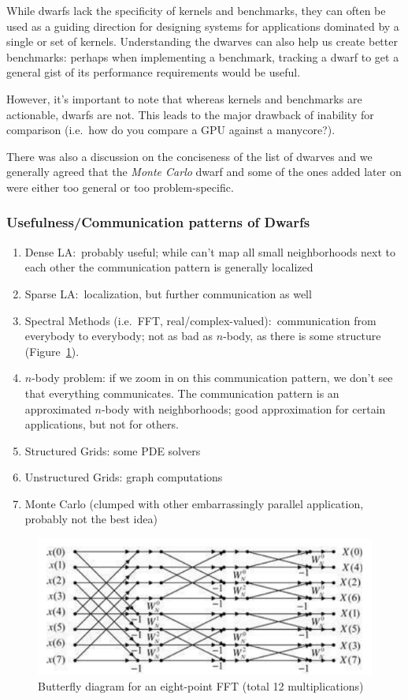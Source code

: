While dwarfs lack the specificity of kernels and benchmarks, they can often be used as a guiding direction for designing systems for applications dominated by a single or set of kernels.
Understanding the dwarves can also help us create better benchmarks: perhaps when implementing a benchmark, tracking a dwarf to get a general gist of its performance requirements would be useful.

However, it's important to note that whereas kernels and benchmarks are actionable, dwarfs are not.
This leads to the major drawback of inability for comparison (i.e.\ how do you compare a GPU against a manycore?).

There was also a discussion on the conciseness of the list of dwarves and we generally agreed that the \textit{Monte Carlo} dwarf and some of the ones added later on were either too general or too problem-specific.

\subsubsection{Usefulness/Communication patterns of Dwarfs}

\begin{enumerate}
    \item Dense LA:\ probably useful; while can't map all small neighborhoods next to each other the communication pattern is generally localized
    \item Sparse LA:\ localization, but further communication as well
    \item Spectral Methods (i.e.\ FFT, real/complex-valued):\ communication from everybody to everybody; not as bad as \( n \)-body, as there is some structure (Figure~\ref{fig:butterfly}).
    \item \( n \)-body problem: if we zoom in on this communication pattern, we don't see that everything communicates.
    The communication pattern is an approximated \( n \)-body with neighborhoods; good approximation for certain applications, but not for others.
    \item Structured Grids: some PDE solvers
    \item Unstructured Grids: graph computations
    \item Monte Carlo (clumped with other embarrassingly parallel application, probably not the best idea)
\end{enumerate}

\begin{figure}
    \centering
    \includegraphics[width = 0.8\linewidth]{fig/butterfly}
    \caption{Butterfly diagram for an eight-point FFT (total 12 multiplications)~\cite{DSP_Tan}}\label{fig:butterfly}
\end{figure}

{}



